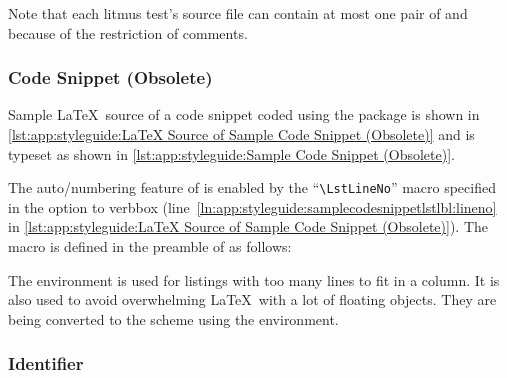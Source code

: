 Note that each litmus test's source file can contain at most one
pair of \co{\\begin[snippet]} and \co{\\end[snippet]} because of
the restriction of comments.

\subsubsection{Code Snippet (Obsolete)}
\label{sec:app:styleguide:Code Snippet (Obsolete)}

Sample \LaTeX\ source of a code snippet coded using
the  package is shown in
\cref{lst:app:styleguide:LaTeX Source of Sample Code Snippet (Obsolete)}
and is typeset as shown in
\cref{lst:app:styleguide:Sample Code Snippet (Obsolete)}.

\begin{listing}
\begin{fcvlabel}
\end{fcvlabel}
\vspace*{-9pt}
\caption{\LaTeX\ Source of Sample Code Snippet (Obsolete)}
\label{lst:app:styleguide:LaTeX Source of Sample Code Snippet (Obsolete)}
\end{listing}



The auto\-/numbering feature of  is enabled by
the ``\verb|\LstLineNo|'' macro specified in the option to verbbox
(line~\ref{ln:app:styleguide:samplecodesnippetlstlbl:lineno} in
\cref{lst:app:styleguide:LaTeX Source of Sample Code Snippet (Obsolete)}).
The macro is defined in the preamble of 
as follows:

\begin{VerbatimU}
\newcommand{\LstLineNo}
  {\makebox[5ex][r]{\arabic{VerbboxLineNo}\hspace{2ex}}}
\end{VerbatimU}

The  environment is used for listings with too many lines
to fit in a column.
It is also used to avoid overwhelming \LaTeX\ with a lot of floating objects.
They are being converted to the scheme using the  environment.

\subsubsection{Identifier}
\label{sec:app:styleguide:Identifier}

